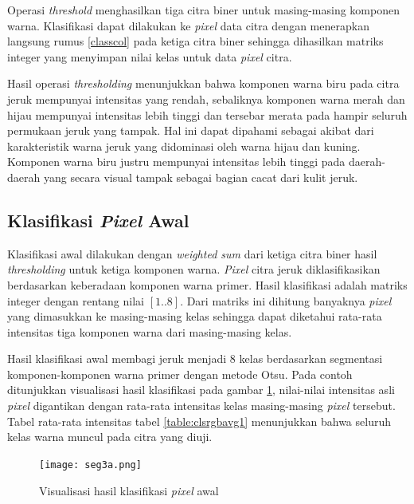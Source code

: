 \documentclass[laporan.tex]{subfiles}
\begin{document}
Operasi \emph{threshold} menghasilkan tiga citra biner untuk masing-masing komponen warna. Klasifikasi dapat dilakukan ke \emph{pixel} data citra dengan menerapkan langsung \mbox{rumus} \ref{classcol} pada ketiga citra biner sehingga dihasilkan matriks integer yang menyimpan nilai kelas untuk data \emph{pixel} citra.

Hasil operasi \emph{thresholding} menunjukkan bahwa komponen warna biru pada citra jeruk mempunyai intensitas yang rendah, sebaliknya komponen warna merah dan hijau mempunyai intensitas lebih tinggi dan tersebar merata pada hampir seluruh permukaan jeruk yang tampak. Hal ini dapat dipahami sebagai akibat dari karakteristik warna jeruk yang didominasi oleh warna hijau dan kuning. Komponen warna biru justru mempunyai intensitas lebih tinggi pada daerah-daerah yang secara visual tampak sebagai bagian cacat dari kulit jeruk.

\subsection{Klasifikasi \emph{Pixel} Awal}

Klasifikasi awal dilakukan dengan \emph{weighted sum} dari ketiga citra biner hasil \emph{thresholding} untuk ketiga komponen warna. \emph{Pixel} citra jeruk diklasifikasikan berdasarkan keberadaan komponen warna primer. Hasil klasifikasi adalah matriks integer dengan rentang nilai $[1..8]$. Dari matriks ini dihitung banyaknya \emph{pixel} yang dimasukkan ke masing-masing kelas sehingga dapat diketahui rata-rata intensitas tiga komponen warna dari masing-masing kelas.

Hasil klasifikasi awal membagi jeruk menjadi 8 kelas berdasarkan segmentasi komponen-komponen warna primer dengan metode Otsu. Pada contoh ditunjukkan visualisasi hasil klasifikasi pada gambar \ref{fig:classinit}, nilai-nilai intensitas asli \emph{pixel} digantikan dengan rata-rata intensitas kelas masing-masing \emph{pixel} tersebut. Tabel rata-rata intensitas tabel \ref{table:clsrgbavg1} menunjukkan bahwa seluruh kelas warna muncul pada citra yang diuji.

\begin{figure}[h]
\centering
\texttt{[image: seg3a.png]}
\caption{Visualisasi hasil klasifikasi \emph{pixel} awal}
\label{fig:classinit}
\end{figure}
\end{document}
